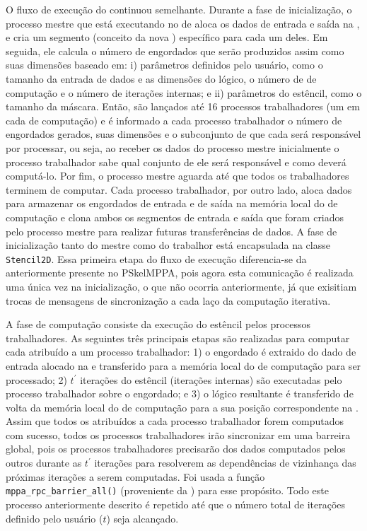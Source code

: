 O fluxo de execução do \pskelmppa continuou semelhante. Durante a fase de inicialização, o processo mestre que está executando no \cluster de \io aloca os dados de entrada e saída na \lpddr, e cria um segmento (conceito da nova \api) específico para cada um deles. Em seguida, ele calcula o número de \tiles engordados que serão produzidos assim como suas dimensões baseado em: i) parâmetros definidos pelo usuário, como o tamanho da entrada de dados e as dimensões do \tile lógico, o número de \clusters de computação e o número de iterações internas; e ii) parâmetros do  estêncil, como o tamanho da máscara. Então, são lançados até 16 processos trabalhadores (um em cada \cluster de computação) e é informado a cada processo trabalhador o número de \tiles engordados gerados, suas dimensões e o subconjunto de \tiles que cada \cluster será responsável por processar, ou seja, ao receber os dados do processo mestre inicialmente o processo trabalhador sabe qual conjunto de \tiles ele será responsável e como deverá computá-lo. Por fim, o processo mestre aguarda até que todos os trabalhadores terminem de computar.
%
Cada processo trabalhador, por outro lado, aloca dados para armazenar os \tiles engordados de entrada e de saída na memória local do \cluster de computação e clona ambos os segmentos de entrada e saída que foram criados pelo processo mestre para realizar futuras transferências de dados. A fase de inicialização tanto do mestre como do trabalhor está encapsulada na classe \texttt{Stencil2D}.
%
Essa primeira etapa do fluxo de execução diferencia-se da anteriormente presente no PSkelMPPA, pois agora esta comunicação é realizada uma única vez na inicialização, o que não ocorria anteriormente, já que exisitiam trocas de mensagens de sincronização a cada laço da computação iterativa.

A fase de computação consiste da execução do  estêncil pelos processos trabalhadores. As seguintes três principais etapas são realizadas para computar cada \tile atribuído a um processo trabalhador: 1) o \tile engordado é extraido do dado de entrada alocado na \lpddr e transferido para a memória local do \cluster de computação para ser processado; 2) $t^\prime$ iterações do  estêncil (iterações internas) são executadas pelo processo trabalhador sobre o \tile engordado; e 3) o \tile lógico resultante é transferido de volta da memória local do \cluster de computação para a sua posição correspondente na \lpddr. Assim que todos os \tiles atribuídos a cada processo trabalhador forem computados com sucesso, todos os processos trabalhadores irão sincronizar em uma barreira global, pois os processos trabalhadores precisarão dos dados computados pelos outros durante as $t^\prime$ iterações para resolverem as dependências de vizinhança das próximas iterações a serem computadas. 
Foi usada a função \texttt{mppa\_rpc\_barrier\_all()} (proveniente da \api \async) para esse propósito. Todo este processo anteriormente descrito é repetido até que o número total de iterações definido pelo usuário ($t$) seja alcançado.

